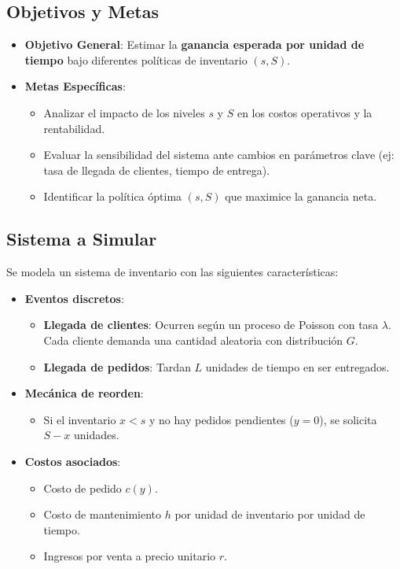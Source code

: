 \documentclass[a4paper,12pt]{article}
\begin{document}
\subsection*{Objetivos y Metas}
\begin{itemize}
    \item \textbf{Objetivo General}:  
    Estimar la \textbf{ganancia esperada por unidad de tiempo} bajo diferentes políticas de inventario \((s, S)\).
    \item \textbf{Metas Específicas}:
    \begin{itemize}
        \item Analizar el impacto de los niveles \( s \) y \( S \) en los costos operativos y la rentabilidad.
        \item Evaluar la sensibilidad del sistema ante cambios en parámetros clave (ej: tasa de llegada de clientes, tiempo de entrega).
        \item Identificar la política óptima \((s, S)\) que maximice la ganancia neta.
    \end{itemize}
\end{itemize}

\subsection*{Sistema a Simular}
Se modela un sistema de inventario con las siguientes características:
\begin{itemize}
    \item \textbf{Eventos discretos}:
    \begin{itemize}
        \item \textbf{Llegada de clientes}: Ocurren según un proceso de Poisson con tasa \( \lambda \). Cada cliente demanda una cantidad aleatoria con distribución \( G \).
        \item \textbf{Llegada de pedidos}: Tardan \( L \) unidades de tiempo en ser entregados.
    \end{itemize}
    \item \textbf{Mecánica de reorden}:
    \begin{itemize}
        \item Si el inventario \( x < s \) y no hay pedidos pendientes (\( y = 0 \)), se solicita \( S - x \) unidades.
    \end{itemize}
    \item \textbf{Costos asociados}:
    \begin{itemize}
        \item Costo de pedido \( c(y) \).
        \item Costo de mantenimiento \( h \) por unidad de inventario por unidad de tiempo.
        \item Ingresos por venta a precio unitario \( r \).
    \end{itemize}
\end{itemize}
\end{document}
